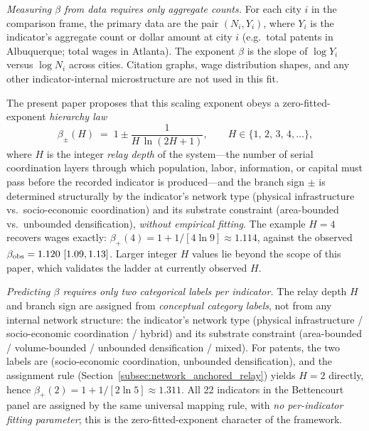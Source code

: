 \emph{Measuring \(\beta\) from data requires only aggregate counts.} For each city \(i\) in the comparison frame, the primary data are the pair \((N_i, Y_i)\), where \(Y_i\) is the indicator's aggregate count or dollar amount at city \(i\) (e.g.\ total patents in Albuquerque; total wages in Atlanta). The exponent \(\beta\) is the slope of \(\log Y_i\) versus \(\log N_i\) across cities. Citation graphs, wage distribution shapes, and any other indicator-internal microstructure are not used in this fit.

The present paper proposes that this scaling exponent obeys a zero-fitted-exponent \emph{hierarchy law}
\begin{equation}
  \beta_{\pm}(H) \;=\; 1 \pm \frac{1}{H\,\ln(2H+1)},
  \qquad H\in\{1,\,2,\,3,\,4,\ldots\},
  \label{eq:hierarchy-law}
\end{equation}
where \(H\) is the integer \emph{relay depth} of the system---the number of serial coordination layers through which population, labor, information, or capital must pass before the recorded indicator is produced---and the branch sign \(\pm\) is determined structurally by the indicator's network type (physical infrastructure vs.\ socio-economic coordination) and its substrate constraint (area-bounded vs.\ unbounded densification), \emph{without empirical fitting}. The example \(H{=}4\) recovers wages exactly: \(\beta_{+}(4)=1+1/[4\ln 9]\approx 1.114\), against the observed \(\beta_{\rm obs}=1.120\ [1.09, 1.13]\). Larger integer \(H\) values lie beyond the scope of this paper, which validates the ladder at currently observed \(H\).

\emph{Predicting \(\beta\) requires only two categorical labels per indicator.} The relay depth \(H\) and branch sign are assigned from \emph{conceptual category labels}, not from any internal network structure: the indicator's network type (physical infrastructure / socio-economic coordination / hybrid) and its substrate constraint (area-bounded / volume-bounded / unbounded densification / mixed). For patents, the two labels are (socio-economic coordination, unbounded densification), and the assignment rule (Section~\ref{subsec:network_anchored_relay}) yields \(H{=}2\) directly, hence \(\beta_{+}(2)=1+1/[2\ln 5]\approx 1.311\). All 22 indicators in the Bettencourt panel are assigned by the same universal mapping rule, with \emph{no per-indicator fitting parameter}; this is the zero-fitted-exponent character of the framework.

